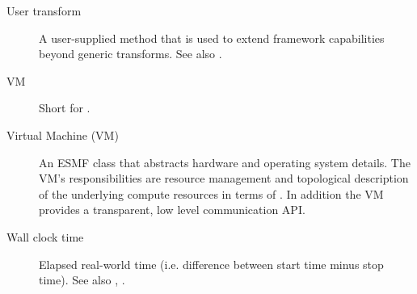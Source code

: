 \begin{description}
\label{glos:UserTrans} 
\item[User transform] 
  A user-supplied 
  method that is used to extend framework capabilities beyond generic 
  transforms. See also . 

\label{glos:VM} 
\item[VM] 
  Short for .

\label{glos:VMachine} 
\item[Virtual Machine (VM)] 
  An ESMF class that abstracts hardware and 
  operating system details. The VM's responsibilities are resource management
  and topological description of the underlying compute resources in terms of 
  . In addition the VM provides a transparent, low level
  communication API. 

\label{glos:WallClockTime} 
\item [Wall clock time] 
  Elapsed real-world time 
  (i.e. difference between start time minus stop time).
  See also , .

\end{description}








































